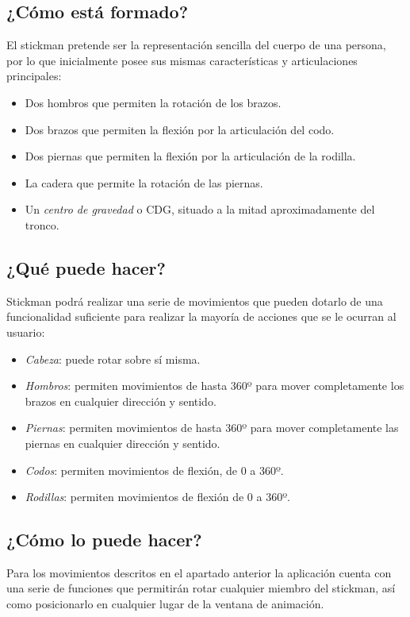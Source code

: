       \subsection{¿Cómo está formado?}
      El stickman pretende ser la representación sencilla del cuerpo de una persona, por lo que inicialmente posee sus mismas características y 
      articulaciones principales: 
      \begin{itemize}
         \item Dos hombros que permiten la rotación de los brazos. 
         \item Dos brazos que permiten la flexión por la articulación del codo. 
         \item Dos piernas que permiten la flexión por la articulación de la rodilla. 
         \item La cadera que permite la rotación de las piernas. 
         \item Un \textit{centro de gravedad} o CDG, situado a la mitad aproximadamente del tronco.\\
      \end{itemize}


      \subsection{¿Qué puede hacer?}
      Stickman podrá realizar una serie de movimientos que pueden dotarlo de una funcionalidad suficiente para realizar la mayoría de acciones 
      que se le ocurran al usuario: 
      \begin{itemize}
         \item \textit{Cabeza}: puede rotar sobre sí misma.
         \item \textit{Hombros}: permiten movimientos de hasta 360º para mover completamente los brazos en cualquier dirección y sentido. 
         \item \textit{Piernas}: permiten movimientos de hasta 360º para mover completamente las piernas en cualquier dirección y sentido.
         \item \textit{Codos}: permiten movimientos de flexión, de 0 a 360º.
         \item \textit{Rodillas}: permiten movimientos de flexión de 0 a 360º.\\
      \end{itemize}


      \subsection{¿Cómo lo puede hacer?}
      Para los movimientos descritos en el apartado anterior la aplicación cuenta con una serie de funciones que permitirán rotar cualquier 
      miembro del stickman, así como posicionarlo en cualquier lugar de la ventana de animación.\\

